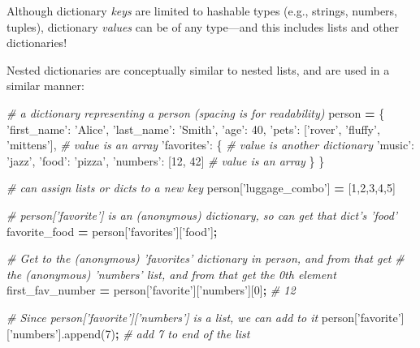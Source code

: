 \documentclass[]{book}
\newenvironment{Shaded}{\begin{snugshade}}{\end{snugshade}}
\newcommand{\DecValTok}[1]{\textcolor[rgb]{0.00,0.00,0.81}{#1}}
\newcommand{\StringTok}[1]{\textcolor[rgb]{0.31,0.60,0.02}{#1}}
\newcommand{\CommentTok}[1]{\textcolor[rgb]{0.56,0.35,0.01}{\textit{#1}}}
\newcommand{\OperatorTok}[1]{\textcolor[rgb]{0.81,0.36,0.00}{\textbf{#1}}}
\newcommand{\NormalTok}[1]{#1}
\begin{document}
Although dictionary \emph{keys} are limited to hashable types (e.g.,
strings, numbers, tuples), dictionary \emph{values} can be of any
type---and this includes lists and other dictionaries!

Nested dictionaries are conceptually similar to nested lists, and are
used in a similar manner:

\begin{Shaded}
\begin{Highlighting}[]
\CommentTok{# a dictionary representing a person (spacing is for readability)}
\NormalTok{person }\OperatorTok{=}\NormalTok{ \{}
  \StringTok{'first_name'}\NormalTok{: }\StringTok{'Alice'}\NormalTok{,}
  \StringTok{'last_name'}\NormalTok{: }\StringTok{'Smith'}\NormalTok{,}
  \StringTok{'age'}\NormalTok{: }\DecValTok{40}\NormalTok{,}
  \StringTok{'pets'}\NormalTok{: [}\StringTok{'rover'}\NormalTok{, }\StringTok{'fluffy'}\NormalTok{, }\StringTok{'mittens'}\NormalTok{],  }\CommentTok{# value is an array}
  \StringTok{'favorites'}\NormalTok{: \{  }\CommentTok{# value is another dictionary}
    \StringTok{'music'}\NormalTok{: }\StringTok{'jazz'}\NormalTok{,}
    \StringTok{'food'}\NormalTok{: }\StringTok{'pizza'}\NormalTok{,}
    \StringTok{'numbers'}\NormalTok{: [}\DecValTok{12}\NormalTok{, }\DecValTok{42}\NormalTok{] }\CommentTok{# value is an array}
\NormalTok{  \}}
\NormalTok{\}}

\CommentTok{# can assign lists or dicts to a new key}
\NormalTok{person[}\StringTok{'luggage_combo'}\NormalTok{] }\OperatorTok{=}\NormalTok{ [}\DecValTok{1}\NormalTok{,}\DecValTok{2}\NormalTok{,}\DecValTok{3}\NormalTok{,}\DecValTok{4}\NormalTok{,}\DecValTok{5}\NormalTok{]}

\CommentTok{# person['favorite'] is an (anonymous) dictionary, so can get that dict's 'food'}
\NormalTok{favorite_food }\OperatorTok{=}\NormalTok{ person[}\StringTok{'favorites'}\NormalTok{][}\StringTok{'food'}\NormalTok{]}\OperatorTok{;}

\CommentTok{# Get to the (anonymous) 'favorites' dictionary in person, and from that get}
\CommentTok{# the (anonymous) 'numbers' list, and from that get the 0th element}
\NormalTok{first_fav_number }\OperatorTok{=}\NormalTok{ person[}\StringTok{'favorite'}\NormalTok{][}\StringTok{'numbers'}\NormalTok{][}\DecValTok{0}\NormalTok{]}\OperatorTok{;}  \CommentTok{# 12}

\CommentTok{# Since person['favorite']['numbers'] is a list, we can add to it}
\NormalTok{person[}\StringTok{'favorite'}\NormalTok{][}\StringTok{'numbers'}\NormalTok{].append(}\DecValTok{7}\NormalTok{)}\OperatorTok{;}  \CommentTok{# add 7 to end of the list}
\end{Highlighting}
\end{Shaded}
\end{document}
